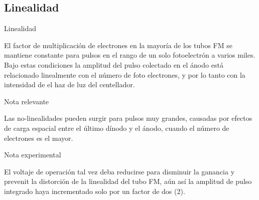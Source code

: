 \documentclass[a4paper,10pt]{beamer}
\begin{document}
\subsection{Linealidad}
\begin{frame}{Linealidad}
 
  \begin{justify}
  El factor de multiplicación de electrones en la mayoría de los tubos FM se mantiene 
  constante para pulsos en el rango de un solo fotoelectrón a varios miles. Bajo estas 
  condiciones la amplitud del pulso colectado en el ánodo está relacionado linealmente 
  con el número de foto electrones, y por lo tanto con la intensidad de el haz de 
  luz del centellador.
  \end{justify}
  
  \begin{block}{Nota relevante}
  \begin{justify}
   Las no-linealidades pueden surgir para pulsos muy grandes, causadas por efectos 
   de carga espacial entre el último dínodo y el ánodo, cuando el número de electrones 
   es el mayor.
   \end{justify}
  \end{block}
  
  \begin{exampleblock}{Nota experimental}
   \begin{justify}
    El voltaje de operación tal vez deba reducirse para disminuir la ganancia y prevenit 
    la distorción de la linealidad del tubo FM, aún así la amplitud de pulso integrado 
    haya incrementado solo por un factor de dos (2).
   \end{justify}
  \end{exampleblock}
 
\end{frame}
\end{document}
